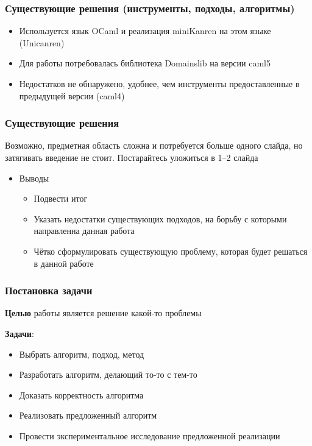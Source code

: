 \documentclass{beamer}
\begin{document}
\begin{frame}
  \frametitle{Существующие решения (инструменты, подходы, алгоритмы)}
  \begin{itemize}
    \item Используется язык OCaml и реализация miniKanren на этом языке (Unicanren)
    \item Для работы потребовалась библиотека Domainslib на версии caml5
    \item Недостатков не обнаружено, удобнее, чем инструменты предоставленные в предыдущей версии (caml4)
  \end{itemize}

\end{frame}

\begin{frame}
  \frametitle{Существующие решения}
  Возможно, предметная область сложна и потребуется больше одного слайда, но затягивать введение не стоит. Постарайтесь уложиться в 1--2 слайда
  \begin{itemize}
    \item Выводы
          \begin{itemize}
            \item Подвести итог
            \item Указать недостатки существующих подходов, на борьбу с которыми
                  направленна данная работа
            \item Чётко сформулировать существующую проблему, которая будет решаться в данной работе
          \end{itemize}
  \end{itemize}
\end{frame}


\begin{frame}
  \frametitle{Постановка задачи}
  \textbf{Целью} работы является решение какой-то проблемы %

  \textbf{Задачи}:
  \begin{itemize}
    \item Выбрать алгоритм, подход, метод %
    \item Разработать алгоритм, делающий то-то с тем-то
    \item Доказать корректность алгоритма
    \item Реализовать предложенный алгоритм
    \item Провести экспериментальное исследование предложенной реализации
  \end{itemize}
\end{frame}
\end{document}
